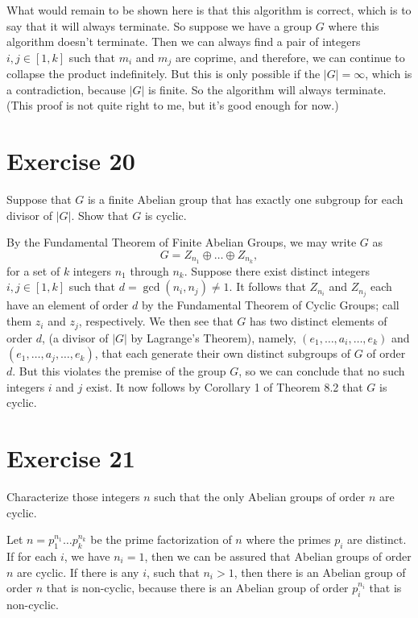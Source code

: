 \documentclass[12pt]{article}
\begin{document}
What would remain to be shown here is that this algorithm is
correct, which is to say that it will always terminate.  So suppose
we have a group $G$ where this algorithm doesn't terminate.
Then we can always find a pair of integers $i,j\in[1,k]$ such
that $m_i$ and $m_j$ are coprime, and therefore, we can
continue to collapse the product indefinitely.  But this is only
possible if the $|G|=\infty$, which is a contradiction, because
$|G|$ is finite.  So the algorithm will always terminate.
(This proof is not quite right to me, but it's good enough for now.)

\section*{Exercise 20}

Suppose that $G$ is a finite Abelian group that has exactly one subgroup
for each divisor of $|G|$.  Show that $G$ is cyclic.

By the Fundamental Theorem of Finite Abelian Groups, we may write $G$ as
\begin{equation*}
G=Z_{n_1}\oplus\dots\oplus Z_{n_k},
\end{equation*}
for a set of $k$ integers $n_1$ through $n_k$.
Suppose there exist distinct integers $i,j\in [1,k]$ such that
$d=\gcd(n_i,n_j)\neq 1$.  It follows that $Z_{n_i}$ and $Z_{n_j}$ each
have an element of order $d$ by the Fundamental Theorem of Cyclic Groups;
call them $z_i$ and $z_j$, respectively.
We then see that $G$ has two distinct elements of order $d$, (a divisor of $|G|$ by
Lagrange's Theorem), namely, $(e_1,\dots,a_i,\dots,e_k)$
and $(e_1,\dots,a_j,\dots,e_k)$, that each generate their own distinct subgroups of $G$
of order $d$.  But this violates the premise of the group $G$, so we can conclude
that no such integers $i$ and $j$ exist.  It now follows by Corollary 1 of Theorem 8.2
that $G$ is cyclic.

\section*{Exercise 21}

Characterize those integers $n$ such that the only Abelian groups of order $n$ are cyclic.

Let $n=p_1^{n_1}\dots p_k^{n_k}$ be the prime factorization of $n$ where
the primes $p_i$ are distinct.  If for each $i$, we have $n_i=1$, then we can
be assured that Abelian groups of order $n$ are cyclic.  If there is any $i$, such that $n_i>1$,
then there is an Abelian group of order $n$ that is non-cyclic, because there is
an Abelian group of order $p_i^{n_i}$ that is non-cyclic.
\end{document}
